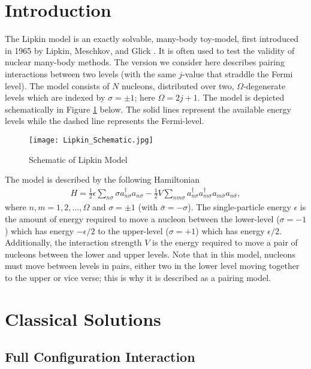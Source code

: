 \documentclass[10pt]{article}
\begin{document}
\section{Introduction}

The Lipkin model is an exactly solvable, many-body toy-model, first introduced in 1965 by Lipkin, Meschkov, and Glick \cite{ref:lipkin}. It is often used to test the validity of nuclear many-body methods. The version we consider here describes pairing interactions between two levels (with the same $j$-value that straddle the Fermi level). The model consists of $N$ nucleons, distributed over two, $\Omega$-degenerate levels which are indexed by $\sigma=\pm1$; here $\Omega=2j+1$. The model is depicted schematically in Figure \ref{fig:lipkin_schem} below. The solid lines represent the available energy levels while the dashed line represents the Fermi-level.
\begin{figure}[b]
    \centering
    \texttt{[image: Lipkin\_Schematic.jpg]}
    \caption{Schematic of Lipkin Model}
    \label{fig:lipkin_schem}
\end{figure}
The model is described by the following Hamiltonian
\begin{align}
\label{hamiltonian}
H
=
\frac{1}{2}\epsilon\sum_{n\sigma}\sigma a^\dagger_{n\sigma}a_{n\sigma}
-
\frac{1}{2}V
\sum_{nm\sigma}a^\dagger_{n\sigma}a^\dagger_{m\sigma}a_{m\bar{\sigma}}a_{n\bar{\sigma}}
,\end{align}
where $n,m=1,2,...,\Omega$ and $\sigma=\pm1$ (with $\bar{\sigma}=-\sigma$). The single-particle energy $\epsilon$ is the amount of energy required to move a nucleon between the lower-level ($\sigma=-1$) which has energy $-\epsilon/2$ to the upper-level ($\sigma=+1$) which has energy $\epsilon/2$. Additionally, the interaction strength $V$ is the energy required to move a pair of nucleons between the lower and upper levels. Note that in this model, nucleons must move between levels in pairs, either two in the lower level moving together to the upper or vice verse; this is why it is described as a pairing model.

\section{Classical Solutions}

\nocite{ref:lipkin_slide}

\subsection{Full Configuration Interaction}
\end{document}
